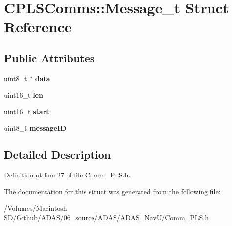 \hypertarget{struct_c_p_l_s_comms_1_1_message__t}{}\section{C\+P\+L\+S\+Comms\+::Message\+\_\+t Struct Reference}
\label{struct_c_p_l_s_comms_1_1_message__t}
\subsection*{Public Attributes}
\begin{DoxyCompactItemize}
\item 
\mbox{\label{struct_c_p_l_s_comms_1_1_message__t_a75d42db0cfdf64c0fe1ed1e8b0c472ed}} 
uint8\+\_\+t $\ast$ {\bfseries data}
\item 
\mbox{\label{struct_c_p_l_s_comms_1_1_message__t_a3af5b7fed96b157285ec6c8168b64276}} 
uint16\+\_\+t {\bfseries len}
\item 
\mbox{\label{struct_c_p_l_s_comms_1_1_message__t_a760e6f39adfed2b0440477560654f02f}} 
uint16\+\_\+t {\bfseries start}
\item 
\mbox{\label{struct_c_p_l_s_comms_1_1_message__t_a451cdd914ba11c33528a4761ad38faee}} 
uint8\+\_\+t {\bfseries message\+ID}
\end{DoxyCompactItemize}


\subsection{Detailed Description}


Definition at line 27 of file Comm\+\_\+\+P\+L\+S.\+h.



The documentation for this struct was generated from the following file\+:\begin{DoxyCompactItemize}
\item 
/\+Volumes/\+Macintosh S\+D/\+Github/\+A\+D\+A\+S/06\+\_\+source/\+A\+D\+A\+S/\+A\+D\+A\+S\+\_\+\+Nav\+U/Comm\+\_\+\+P\+L\+S.\+h\end{DoxyCompactItemize}
